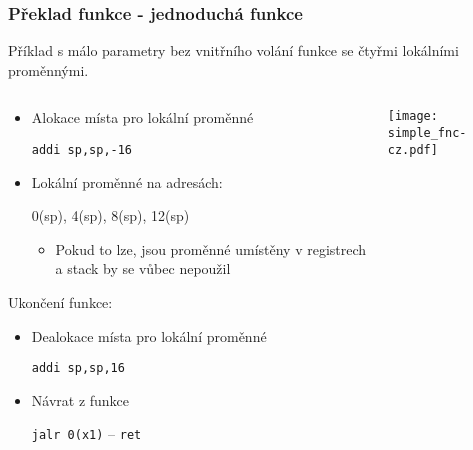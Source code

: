 \documentclass{beamer}
\begin{document}
\begin{frame}
\frametitle{Překlad funkce - jednoduchá funkce}

Příklad s málo parametry bez vnitřního volání funkce se čtyřmi lokálními proměnnými.
\begin{columns}
\begin{column}{0.65\textwidth}
\begin{itemize}
 \item Alokace místa pro lokální proměnné 
 
 \texttt{addi  sp,sp,-16}
 \item Lokální proměnné na adresách: 
 
 0(sp), 4(sp), 8(sp), 12(sp)
\begin{itemize}
 \item Pokud to lze, jsou proměnné umístěny v registrech a stack by se vůbec nepoužil
\end{itemize}
\end{itemize}

Ukončení funkce:
\begin{itemize}
 \item Dealokace místa pro lokální proměnné 
 
 \texttt{addi  sp,sp,16}
 \item Návrat z funkce 
 
 \texttt{jalr 0(x1)} -- \texttt{ret} 
\end{itemize}
\end{column}
\begin{column}{0.35\textwidth}  
\texttt{[image: simple\_fnc-cz.pdf]}
\end{column}
\end{columns}

\end{frame}
\end{document}
